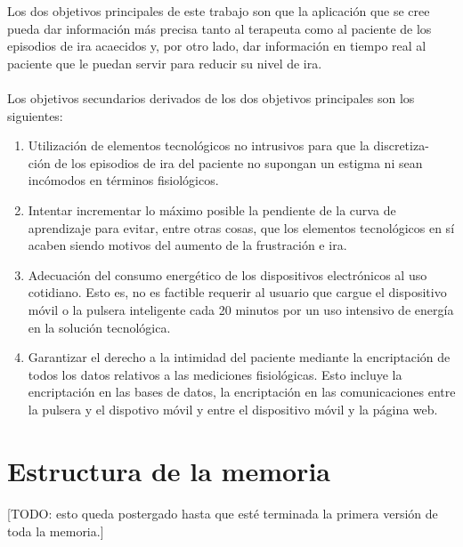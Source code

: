 Los dos objetivos principales de este trabajo son que la aplicación que se cree pueda dar información más precisa tanto al terapeuta como al paciente de los episodios de ira acaecidos y, por otro lado, dar información en tiempo real al paciente que le puedan servir para reducir su nivel de ira.

\paragraph{}
Los objetivos secundarios derivados de los dos objetivos principales son los siguientes:
\begin{enumerate}
    \item Utilización de elementos tecnológicos no intrusivos para que la discretiza-\\ción de los episodios de ira del paciente no supongan un estigma ni sean incómodos en términos fisiológicos.
    \item Intentar incrementar lo máximo posible la pendiente de la curva de aprendizaje para evitar, entre otras cosas, que los elementos tecnológicos en sí acaben siendo motivos del aumento de la frustración e ira.
    \item Adecuación del consumo energético de los dispositivos electrónicos al uso cotidiano. Esto es, no es factible requerir al usuario que cargue el dispositivo móvil o la pulsera inteligente cada 20 minutos por un uso intensivo de energía en la solución tecnológica.
    \item Garantizar el derecho a la intimidad del paciente mediante la encriptación de todos los datos relativos a las mediciones fisiológicas. Esto incluye la encriptación en las bases de datos, la encriptación en las comunicaciones entre la pulsera y el dispotivo móvil y entre el dispositivo móvil y la página web.
\end{enumerate}

\section{Estructura de la memoria}
\label{sec:estructuraMemoria}
\paragraph{}
[TODO: esto queda postergado hasta que esté terminada la primera versión de toda la memoria.]